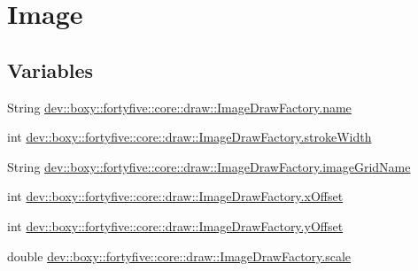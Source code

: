 \hypertarget{group__image}{
\section{Image}
\label{dd/d57/group__image}
}
\subsection*{Variables}
\begin{DoxyCompactItemize}
\item 
String \hyperlink{group__image_ga0b4425fc6fc125f08a69acd817b3e928}{dev::boxy::fortyfive::core::draw::ImageDrawFactory.name}
\item 
int \hyperlink{group__image_ga55543d51eec3d277bc6141062937ac94}{dev::boxy::fortyfive::core::draw::ImageDrawFactory.strokeWidth}
\item 
String \hyperlink{group__image_ga449860e416518546c82bd58fd6ca2c0d}{dev::boxy::fortyfive::core::draw::ImageDrawFactory.imageGridName}
\item 
int \hyperlink{group__image_ga6be37b38c2cff42f387e0357b769f6df}{dev::boxy::fortyfive::core::draw::ImageDrawFactory.xOffset}
\item 
int \hyperlink{group__image_ga7013263410dc0d0e0cfe528ce2f10eed}{dev::boxy::fortyfive::core::draw::ImageDrawFactory.yOffset}
\item 
double \hyperlink{group__image_ga49b6468f905e5801eb9fb81931de7a00}{dev::boxy::fortyfive::core::draw::ImageDrawFactory.scale}
\end{DoxyCompactItemize}


